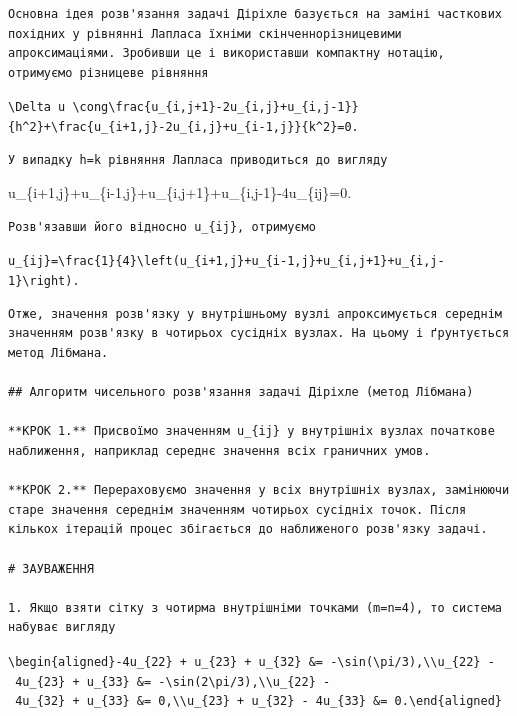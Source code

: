 \documentclass[
  ukrainian,
]{article}
\begin{document}
\begin{verbatim}
Основна ідея розв'язання задачі Діріхле базується на заміні часткових похідних у рівнянні Лапласа їхніми скінченнорізницевими апроксимаціями. Зробивши це і використавши компактну нотацію, отримуємо різницеве рівняння
\end{verbatim}

\texttt{\textbackslash{}Delta\ u\ \textbackslash{}cong\textbackslash{}frac\{u\_\{i,j+1\}-2u\_\{i,j\}+u\_\{i,j-1\}\}\{h\^{}2\}+\textbackslash{}frac\{u\_\{i+1,j\}-2u\_\{i,j\}+u\_\{i-1,j\}\}\{k\^{}2\}=0.}

\begin{verbatim}
У випадку h=k рівняння Лапласа приводиться до вигляду
\end{verbatim}

u\_\{i+1,j\}+u\_\{i-1,j\}+u\_\{i,j+1\}+u\_\{i,j-1\}-4u\_\{ij\}=0.

\begin{verbatim}
Розв'язавши його відносно u_{ij}, отримуємо
\end{verbatim}

\texttt{u\_\{ij\}=\textbackslash{}frac\{1\}\{4\}\textbackslash{}left(u\_\{i+1,j\}+u\_\{i-1,j\}+u\_\{i,j+1\}+u\_\{i,j-1\}\textbackslash{}right).}

\begin{verbatim}
Отже, значення розв'язку у внутрішньому вузлі апроксимується середнім значенням розв'язку в чотирьох сусідніх вузлах. На цьому і ґрунтується метод Лібмана.

## Алгоритм чисельного розв'язання задачі Діріхле (метод Лібмана)

**КРОК 1.** Присвоїмо значенням u_{ij} у внутрішніх вузлах початкове наближення, наприклад середнє значення всіх граничних умов.

**КРОК 2.** Перераховуємо значення у всіх внутрішніх вузлах, замінюючи старе значення середнім значенням чотирьох сусідніх точок. Після кількох ітерацій процес збігається до наближеного розв'язку задачі.

# ЗАУВАЖЕННЯ

1. Якщо взяти сітку з чотирма внутрішніми точками (m=n=4), то система набуває вигляду
\end{verbatim}

\texttt{\textbackslash{}begin\{aligned\}-4u\_\{22\}\ +\ u\_\{23\}\ +\ u\_\{32\}\ \&=\ -\textbackslash{}sin(\textbackslash{}pi/3),\textbackslash{}\textbackslash{}u\_\{22\}\ -\ 4u\_\{23\}\ +\ u\_\{33\}\ \&=\ -\textbackslash{}sin(2\textbackslash{}pi/3),\textbackslash{}\textbackslash{}u\_\{22\}\ -\ 4u\_\{32\}\ +\ u\_\{33\}\ \&=\ 0,\textbackslash{}\textbackslash{}u\_\{23\}\ +\ u\_\{32\}\ -\ 4u\_\{33\}\ \&=\ 0.\textbackslash{}end\{aligned\}}
\end{document}

